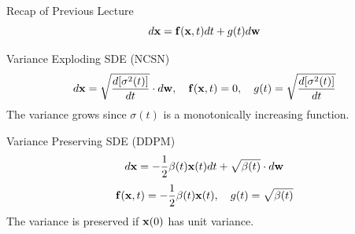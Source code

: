 \documentclass{beamer}
\begin{document}
\begin{frame}
\titlepage
	\resetonslide
\end{frame}
\begin{frame}{Recap of Previous Lecture}
	\vspace{-0.3cm}
	\[
		d\mathbf{x} = \mathbf{f}(\mathbf{x}, t) dt + g(t) d \mathbf{w}
	\]
	\vspace{-0.3cm}
	\begin{block}{Variance Exploding SDE (NCSN)}
		\vspace{-0.5cm}
		\[
			d \mathbf{x} = \sqrt{\frac{ d [\sigma^2(t)]}{dt}} \cdot d \mathbf{w}, \quad \mathbf{f}(\mathbf{x}, t) = 0, \quad g(t) = \sqrt{\frac{ d [\sigma^2(t)]}{dt}} 
		\]
		The variance grows since $\sigma(t)$ is a monotonically increasing function.
	\end{block}
	\begin{block}{Variance Preserving SDE (DDPM)}
		\vspace{-0.3cm}
		\[
			d \mathbf{x} = - \frac{1}{2} \beta(t) \mathbf{x}(t) dt + \sqrt{\beta(t)} \cdot d \mathbf{w}
		\]
		\[
			\mathbf{f}(\mathbf{x}, t) = - \frac{1}{2} \beta(t) \mathbf{x}(t) , \quad g(t) = \sqrt{\beta(t)} 
		\]
		The variance is preserved if $\mathbf{x}(0)$ has unit variance.
	\end{block}
\end{frame}
\end{document}
